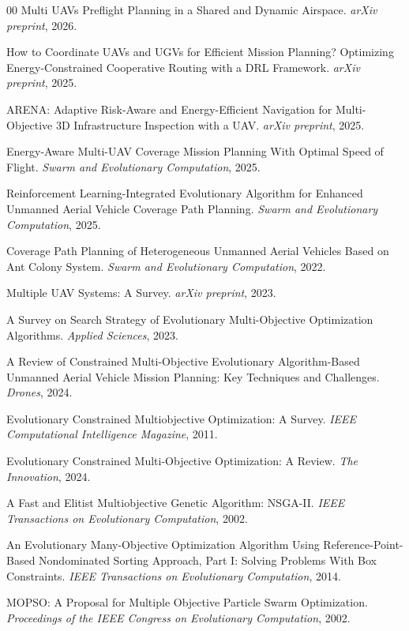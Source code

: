 \documentclass[a4paper,fleqn]{cas-dc}
\begin{document}
\begin{thebibliography}{00}
Multi UAVs Preflight Planning in a Shared and Dynamic Airspace.
\textit{arXiv preprint}, 2026.

How to Coordinate UAVs and UGVs for Efficient Mission Planning? Optimizing Energy-Constrained Cooperative Routing with a DRL Framework.
\textit{arXiv preprint}, 2025.

ARENA: Adaptive Risk-Aware and Energy-Efficient Navigation for Multi-Objective 3D Infrastructure Inspection with a UAV.
\textit{arXiv preprint}, 2025.

Energy-Aware Multi-UAV Coverage Mission Planning With Optimal Speed of Flight.
\textit{Swarm and Evolutionary Computation}, 2025.

Reinforcement Learning-Integrated Evolutionary Algorithm for Enhanced Unmanned Aerial Vehicle Coverage Path Planning.
\textit{Swarm and Evolutionary Computation}, 2025.

Coverage Path Planning of Heterogeneous Unmanned Aerial Vehicles Based on Ant Colony System.
\textit{Swarm and Evolutionary Computation}, 2022.

Multiple UAV Systems: A Survey.
\textit{arXiv preprint}, 2023.

A Survey on Search Strategy of Evolutionary Multi-Objective Optimization Algorithms.
\textit{Applied Sciences}, 2023.

A Review of Constrained Multi-Objective Evolutionary Algorithm-Based Unmanned Aerial Vehicle Mission Planning: Key Techniques and Challenges.
\textit{Drones}, 2024.

Evolutionary Constrained Multiobjective Optimization: A Survey.
\textit{IEEE Computational Intelligence Magazine}, 2011.

Evolutionary Constrained Multi-Objective Optimization: A Review.
\textit{The Innovation}, 2024.

A Fast and Elitist Multiobjective Genetic Algorithm: NSGA-II.
\textit{IEEE Transactions on Evolutionary Computation}, 2002.

An Evolutionary Many-Objective Optimization Algorithm Using Reference-Point-Based Nondominated Sorting Approach, Part I: Solving Problems With Box Constraints.
\textit{IEEE Transactions on Evolutionary Computation}, 2014.

MOPSO: A Proposal for Multiple Objective Particle Swarm Optimization.
\textit{Proceedings of the IEEE Congress on Evolutionary Computation}, 2002.


\end{thebibliography}
\end{document}
